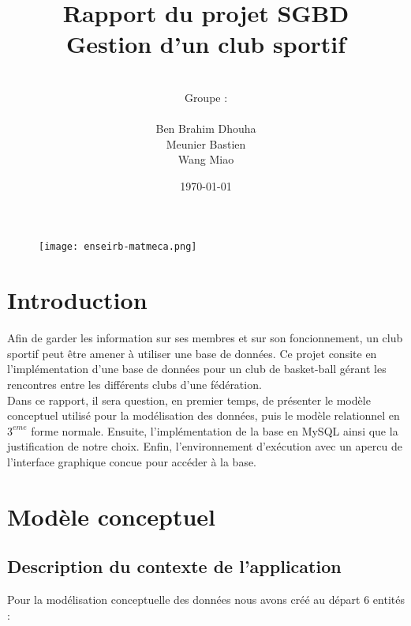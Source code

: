 \documentclass{article}
\date{\vspace{3 cm} \today}
\author{\vspace{4 cm} \\ Groupe :\\ \\Ben Brahim Dhouha\\Meunier Bastien\\Wang Miao }
\title{Rapport du projet SGBD \\ Gestion d'un club sportif}
\begin{document}
\thispagestyle{empty}
\begin{figure}
\texttt{[image: enseirb-matmeca.png]}
\end{figure}
\maketitle

\newpage

\section*{Introduction}

Afin de garder les information sur ses membres et sur son foncionnement, un club sportif peut être amener à utiliser une base de données. Ce projet consite en l'implémentation d'une base de données pour un club de basket-ball gérant les rencontres entre les différents clubs d'une fédération. \\

Dans ce rapport, il sera question, en premier temps, de présenter le modèle conceptuel utilisé pour la modélisation des données, puis le modèle relationnel en $3^{eme}$ forme normale. Ensuite, l'implémentation de la base en MySQL ainsi que la justification de notre choix. Enfin, l'environnement d'exécution avec un apercu de l'interface graphique concue pour accéder à la base. 


\newpage
\tableofcontents

\newpage
\section{Modèle conceptuel}

\subsection{Description du contexte de l'application}
Pour la modélisation conceptuelle des données nous avons créé au départ 6 entités : \\
\end{document}
